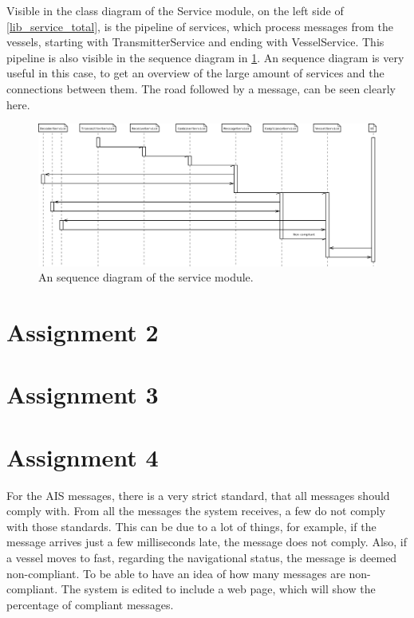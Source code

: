 \documentclass[12pt]{article}
\begin{document}
Visible in the class diagram of the Service module, on the left side of \ref{lib_service_total}, is the pipeline of services, which process messages from the vessels, starting with TransmitterService and ending with VesselService. This pipeline is also visible in the sequence diagram in \ref{sequence_diagram}. An sequence diagram is very useful in this case, to get an overview of the large amount of services and the connections between them. The road followed by a message, can be seen clearly here.

\begin{figure}[!h]
  \centering
  \includegraphics[width=5.4in]{activity_diagram}
  \caption{An sequence diagram of the service module.}
  \label{sequence_diagram}
\end{figure}

\section*{Assignment 2}

\section*{Assignment 3}

\section*{Assignment 4}
For the AIS messages, there is a very strict standard, that all  messages should comply with. From all the messages the system receives, a few do not comply with those standards. This can be due to a lot of things, for example, if the message arrives just a few milliseconds late, the message does not comply. Also, if a vessel moves to fast, regarding the navigational status, the message is deemed non-compliant. To be able to have an idea of how many messages are non-compliant. The system is edited to include a web page, which will show the percentage of compliant messages.
\end{document}
